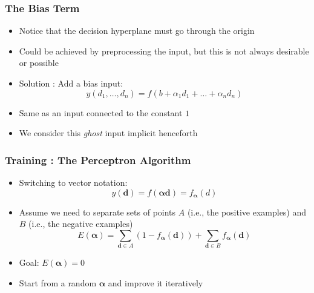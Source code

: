 \documentclass{beamer}
\begin{document}
\begin{frame} \frametitle{The Bias Term}
  \begin{itemize}
  \item Notice that the decision hyperplane must go through the origin
  \item Could be achieved by preprocessing the input, but this is not always desirable or possible
  \item Solution : Add a bias input:
  \begin{equation*}
    y(d_1,\ldots,d_n) = f(b + \alpha_1d_1 + \ldots + \alpha_nd_n)
  \end{equation*}
  \item Same as an input connected to the constant $1$
  \item We consider this {\it ghost} input implicit henceforth
  \end{itemize}
\end{frame}

\begin{frame} \frametitle{Training : The Perceptron Algorithm}
    \begin{itemize}
    \item Switching to vector notation:
        \begin{equation}
            y(\mathbf d) = f(\mathbf \alpha \mathbf d) = f_{\mathbf \alpha}(d)
        \end{equation}
    \item Assume we need to separate sets of points $A$ (i.e., the positive examples) and $B$ (i.e., the negative examples)
        \begin{equation}
            E(\mathbf \alpha) = \displaystyle\sum_{\mathbf d\in A}(1 - f_{\mathbf \alpha}(\mathbf d)) + \displaystyle\sum_{\mathbf d\in B}f_{\mathbf \alpha}(\mathbf d)
        \end{equation}
    \item Goal: $E(\mathbf \alpha) = 0$
    \item Start from a random $\mathbf \alpha$ and improve it iteratively
    \end{itemize}
\end{frame}
\end{document}
